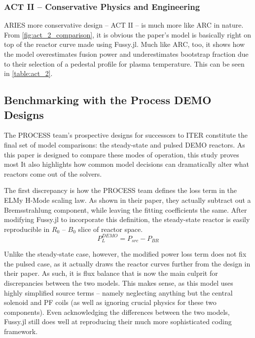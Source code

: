 \subsubsection{ACT II -- Conservative Physics and Engineering}

ARIES more conservative design -- ACT II -- is much more like ARC in nature. From \cref{fig:act_2_comparison}, it is obvious the paper's model is basically right on top of the reactor curve made using Fussy.jl.  Much like ARC, too, it shows how the model overestimates fusion power and underestimates bootstrap fraction due to their selection of a pedestal profile for plasma temperature. This can be seen in \cref{table:act_2}.

\subsection{Benchmarking with the Process DEMO Designs}

The PROCESS team's prospective designs for successors to ITER constitute the final set of model comparisons: the steady-state and pulsed DEMO reactors. As this paper is designed to compare these modes of operation, this study proves most  It also highlights how common model decisions can dramatically alter what reactors come out of the solvers.

The first discrepancy is how the PROCESS team defines the loss term in the ELMy H-Mode scaling law. As shown in their paper, they actually subtract out a Bremsstrahlung component, while leaving the fitting coefficients the same. \cite{process} After modifying Fussy.jl to incorporate this definition, the steady-state reactor is easily reproducible in $R_0$ -- $B_0$ slice of reactor space.
\begin{equation}
	\label{eq:pl_demo}
	P_L^{DEMO} = P_{src} - P_{BR}
\end{equation}

Unlike the steady-state case, however, the modified power loss term does not fix the pulsed case, as it actually draws the reactor curves further from the design in their paper. As such, it is flux balance that is now the main culprit for discrepancies between the two models. This makes sense, as this model uses highly simplified source terms -- namely neglecting anything but the central solenoid and PF coils (as well as ignoring crucial physics for these two components). Even acknowledging the differences between the two models, Fussy.jl still does  well at reproducing their much more sophisticated coding framework.

